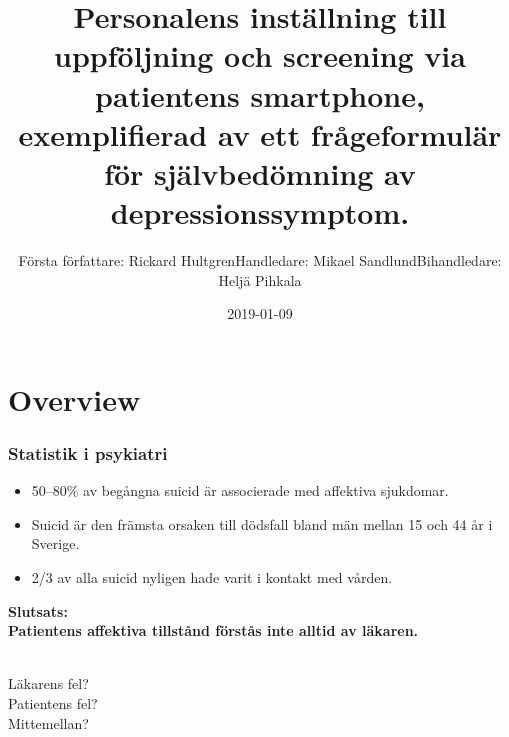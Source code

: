 \documentclass[english]{beamer}
\date{2019-01-09}
\renewcommand{\url}[1]{%
\fontfamily{helvet}\selectfont{\textsf{#1}}%
}
\begin{document}
\title{Personalens inst{\"a}llning till uppf{\"o}ljning och screening via patientens smartphone, exemplifierad av ett fr{\aa}geformul{\"a}r f{\"o}r sj{\"a}lvbed{\"o}mning av depressionssymptom.}
\author[]{F{\"o}rsta f{\"o}rfattare: Rickard Hultgren\newline Handledare: Mikael Sandlund\newline Bihandledare: Helj{\"a} Pihkala}


\begin{frame}
	\titlepage
\end{frame}


\section{Overview}
\begin{frame}
	\frametitle{Statistik i psykiatri}

	\begin{itemize}
	\item 50--80\% av beg{\aa}ngna suicid {\"a}r associerade med affektiva sjukdomar.
	\item Suicid {\"a}r den fr{\"a}msta orsaken till d{\"o}dsfall bland m{\"a}n mellan 15 och 44 {\aa}r i Sverige.
	\item 2/3 av alla suicid nyligen hade varit i kontakt med v{\aa}rden.
	\end{itemize}

	\pause

	\textbf{Slutsats:\\Patientens affektiva tillst{\aa}nd f{\"o}rst{\aa}s inte alltid av l{\"a}karen.}\\\ \\

\pause

L{\"a}karens fel?\\
Patientens fel?\\
\pause
Mittemellan?
\end{frame}
\end{document}
